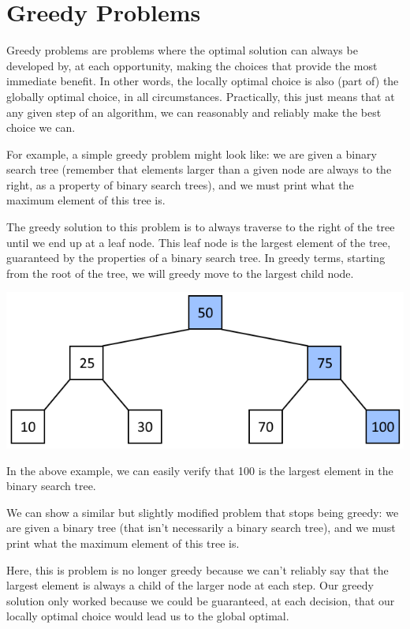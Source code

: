 \section{Greedy Problems}

Greedy problems are problems where the optimal solution can always be developed by, at each opportunity, making the choices that provide the most immediate benefit. In other words, the locally optimal choice is also (part of) the globally optimal choice, in all circumstances. Practically, this just means that at any given step of an algorithm, we can reasonably and reliably make the best choice we can.

For example, a simple greedy problem might look like: we are given a binary search tree (remember that elements larger than a given node are always to the right, as a property of binary search trees), and we must print what the maximum element of this tree is.

The greedy solution to this problem is to always traverse to the right of the tree until we end up at a leaf node. This leaf node is the largest element of the tree, guaranteed by the properties of a binary search tree. In greedy terms, starting from the root of the tree, we will greedy move to the largest child node.

{\centering \includegraphics[width=\textwidth]{images/greedy/greedy_tree_1.png}}

In the above example, we can easily verify that 100 is the largest element in the binary search tree.

We can show a similar but slightly modified problem that stops being greedy: we are given a binary tree (that isn't necessarily a binary search tree), and we must print what the maximum element of this tree is.

Here, this is problem is no longer greedy because we can't reliably say that the largest element is always a child of the larger node at each step. Our greedy solution only worked because we could be guaranteed, at each decision, that our locally optimal choice would lead us to the global optimal.

